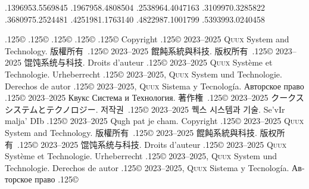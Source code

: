 \documentclass{cookbook}
\begin{document}
{{{	.1396953\textwidth .5569845\textwidth%
	.1967958\textwidth .4808504\textwidth
	.2538964\textwidth .4047163\textwidth
	.3109970\textwidth .3285822\textwidth
	.3680975\textwidth .2524481\textwidth
	.4251981\textwidth .1763140\textwidth%
	.4822987\textwidth .1001799\textwidth%
	.5393993\textwidth .0240458\textwidth%
\rule{0pt}{0pt}%
{\lower.125\baselineskip\hbox{\copyright}}
{\lower.125\baselineskip\hbox{\copyright}}
{\lower.125\baselineskip\hbox{\copyright}}
{\lower.125\baselineskip\hbox{\copyright}}
{\lower.125\baselineskip\hbox{\copyright}}
Copyright {\lower.125\baselineskip\hbox{\copyright}}
	2023--2025 \textsc{Quux} System and Technology.
版權所有~{\lower.125\baselineskip\hbox{\copyright}}
	2023--2025 餛飩系統與科技.
版权所有~{\lower.125\baselineskip\hbox{\copyright}}
	2023--2025 馄饨系统与科技.
Droits d'auteur {\lower.125\baselineskip\hbox{\copyright}} %
	2023--2025 \textsc{Quux} Système et Technologie.
Urheberrecht {\lower.125\baselineskip\hbox{\copyright}} %
	2023--2025, \textsc{Quux} System und Technologie.
Derechos de autor {\lower.125\baselineskip\hbox{\copyright}} %
	2023--2025, \textsc{Quux} Sistema y Tecnología.
\foreignlanguage{russian}{Авторское право} %
	{\lower.125\baselineskip\hbox{\copyright}}
	2023–2025 \foreignlanguage{russian}{Квукс Система и Технология.}
著作権~{\lower.125\baselineskip\hbox{\copyright}}
	2023--2025 クークスシステムとテクノロジー.
저작권~{\lower.125\baselineskip\hbox{\copyright}}
	2023--2025 퀙스 시스템과 기술.
Se'vIr malja' DIb {\lower.125\baselineskip\hbox{\copyright}} %
	2023--2025 Qugh pat je cham.
Copyright {\lower.125\baselineskip\hbox{\copyright}}
	2023--2025 \textsc{Quux} System and Technology.
版權所有~{\lower.125\baselineskip\hbox{\copyright}}
	2023--2025 餛飩系統與科技.
版权所有~{\lower.125\baselineskip\hbox{\copyright}}
	2023--2025 馄饨系统与科技.
Droits d'auteur {\lower.125\baselineskip\hbox{\copyright}} %
	2023--2025 \textsc{Quux} Système et Technologie.
Urheberrecht {\lower.125\baselineskip\hbox{\copyright}} %
	2023--2025, \textsc{Quux} System und Technologie.
Derechos de autor {\lower.125\baselineskip\hbox{\copyright}} %
	2023--2025, \textsc{Quux} Sistema y Tecnología.
\foreignlanguage{russian}{Авторское право} %
	{\lower.125\baselineskip\hbox{\copyright}}
}}}
\end{document}
